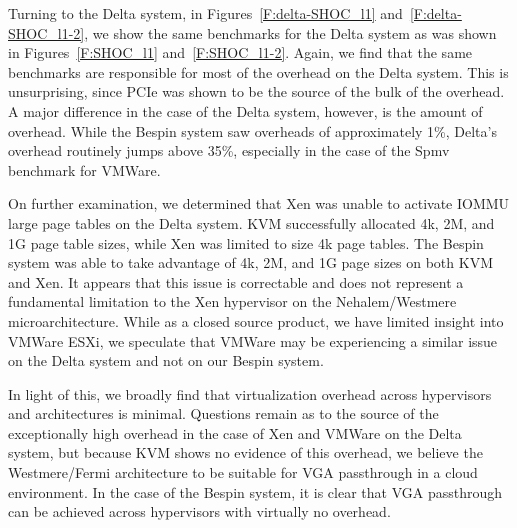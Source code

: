 
Turning to the Delta system, in Figures~\ref{F:delta-SHOC_l1}
and~\ref{F:delta-SHOC_l1-2}, we show the same benchmarks for the Delta system as
was shown in Figures~\ref{F:SHOC_l1} and~\ref{F:SHOC_l1-2}.  Again, we find that the
same benchmarks are responsible for most of the overhead on the Delta system.  This is
unsurprising, since PCIe was shown to be the source of the bulk of the overhead.
A major difference in the case of the Delta system, however, is the amount of
overhead.  While the Bespin system saw overheads of approximately 1\%, Delta's overhead
routinely jumps above 35\%, especially in the case of the Spmv benchmark for
VMWare.  

On further examination, we determined that Xen was unable to activate
IOMMU large page tables on the Delta system.  KVM successfully allocated 4k, 2M,
and 1G page table sizes, while Xen was limited to size 4k page tables.  The
Bespin system was able to take advantage of 4k, 2M, and 1G page sizes on both
KVM and Xen.  It appears that this issue is correctable and does not represent a
fundamental limitation to the Xen hypervisor on the Nehalem/Westmere
microarchitecture.  While as a closed source product,  we have limited insight
into VMWare ESXi, we speculate that VMWare may be experiencing a similar issue
on the Delta system and not on our Bespin system.



In light of this, we broadly find that virtualization overhead across
hypervisors and architectures is minimal.  Questions remain as to the source of the
exceptionally high overhead in the case of Xen and VMWare on the Delta
system, but because KVM shows no evidence of this overhead, we believe the
Westmere/Fermi architecture to be suitable for VGA passthrough in a cloud
environment.  In the case of the Bespin system, it is clear that VGA passthrough can be
achieved across hypervisors with virtually no overhead.  


